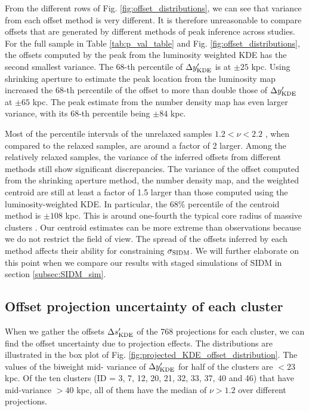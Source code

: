 From the different rows of Fig. \ref{fig:offset_distributions}, we can see 
that variance from each offset method is very different.
It is therefore unreasonable to compare offsets that are generated 
by different methods of peak inference across studies.
For the full sample in Table \ref{tab:p_val_table} and Fig. 
\ref{fig:offset_distributions},
the offsets computed by the peak from the luminosity weighted KDE 
has the second smallest variance. The 68-th percentile of $\Delta y_{\rm
KDE}'$ is at $\pm 25$ kpc. Using shrinking aperture to estimate
the peak location from the luminosity map increased the 68-th percentile of the
offset to more than double those of $\Delta y_{\rm KDE}'$ at $\pm 65$ kpc.
The peak estimate from the number density map has even larger variance, 
with its 68-th percentile being $\pm 84$ kpc. 

Most of the percentile intervals of the unrelaxed samples $ 1.2 < \nu < 2.2$ , 
when compared to the relaxed samples, are around a factor of 2 larger. 
Among the relatively relaxed samples, the variance of the inferred offsets from different
methods still show significant discrepancies. 
The variance of the offset computed from the shrinking aperture method, 
the number density map, and the weighted centroid are still at least a factor of 1.5
larger than those computed using the luminosity-weighted KDE. 
In particular, the 68\% percentile of the centroid method is $\pm 108$ kpc.
This is around one-fourth the typical core radius of massive clusters
\citep{Allen1998}. Our centroid estimates can be more extreme than observations
because we do not restrict the field of view.
The spread of the offsets inferred by each method affects their ability
for constraining $\sigma_{\rm SIDM}$. We will further elaborate on this point
when we compare our results with staged simulations of SIDM in section
\ref{subsec:SIDM_sim}. 


\subsection{Offset projection uncertainty of each cluster}
\label{subsec:projections}
When we gather the offsets $\Delta s_{\rm KDE}'$ of the 
768 projections for each cluster,
we can find the offset uncertainty due to projection effects.
The distributions are illustrated in the box plot of Fig. 
\ref{fig:projected_KDE_offset_distribution}. The values of the biweight mid-
variance of $\Delta y_{\rm KDE}'$ for half of the clusters
are $< 23$ kpc. Of the ten clusters (ID = 3, 7, 12, 20, 21, 32, 33, 37, 40 and 46) 
that have mid-variance $ > 40$ kpc, all of them have the median of $\nu > 1.2$
over different projections.
 
